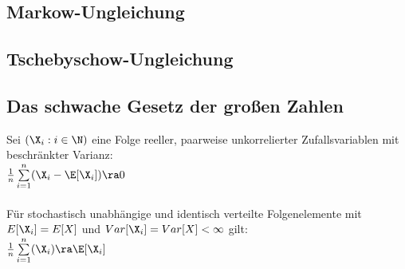 \documentclass[german,color,6pt]{latex4ei/latex4ei_sheet}
\begin{document}
\begin{sectionbox}
	\subsection{Markow-Ungleichung}
\end{sectionbox}

\begin{sectionbox}
	\subsection{Tschebyschow-Ungleichung}


\end{sectionbox}
\begin{sectionbox}
	\subsection{Das schwache Gesetz der großen Zahlen}
	Sei $(\X_i : i \in \N)$ eine Folge reeller, paarweise unkorrelierter Zufallsvariablen mit beschränkter Varianz:\\
	$\frac{1}{n} \sum\limits_{i = 1}^n (\X_i - \E[\X_i]) \ra 0$\\ \\
	Für stochastisch unabhängige und identisch verteilte Folgenelemente mit $E[\X_i] = E[X]$ und $Var[\X_i] = Var[X] < \infty$ gilt: \\
	$\frac{1}{n} \sum\limits_{i = 1}^n (\X_i) \ra \E[\X_i] $
\end{sectionbox}

\end{document}
